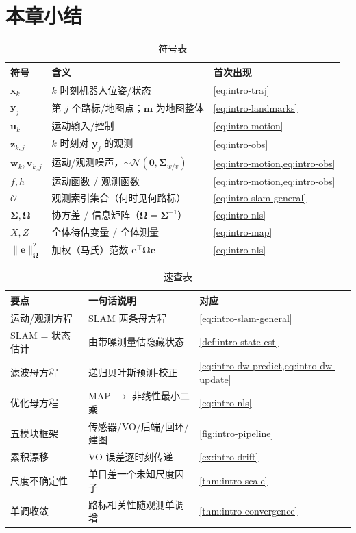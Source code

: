 \section*{本章小结}

\begin{table}[H]\centering\small
\caption{符号表}
\begin{tabular}{lll}
\toprule
符号 & 含义 & 首次出现 \\
\midrule
$\mathbf{x}_k$ & $k$ 时刻机器人位姿/状态 & \cref{eq:intro-traj} \\
$\mathbf{y}_j$ & 第 $j$ 个路标/地图点；$\mathbf{m}$ 为地图整体 & \cref{eq:intro-landmarks} \\
$\mathbf{u}_k$ & 运动输入/控制 & \cref{eq:intro-motion} \\
$\mathbf{z}_{k,j}$ & $k$ 时刻对 $\mathbf{y}_j$ 的观测 & \cref{eq:intro-obs} \\
$\mathbf{w}_k,\mathbf{v}_{k,j}$ & 运动/观测噪声，$\sim\mathcal{N}(\mathbf{0},\boldsymbol{\Sigma}_{w/v})$ & \cref{eq:intro-motion,eq:intro-obs} \\
$f,h$ & 运动函数 / 观测函数 & \cref{eq:intro-motion,eq:intro-obs} \\
$\mathcal{O}$ & 观测索引集合（何时见何路标） & \cref{eq:intro-slam-general} \\
$\boldsymbol{\Sigma},\boldsymbol{\Omega}$ & 协方差 / 信息矩阵（$\boldsymbol{\Omega}=\boldsymbol{\Sigma}^{-1}$） & \cref{eq:intro-nls} \\
$X,Z$ & 全体待估变量 / 全体测量 & \cref{eq:intro-map} \\
$\|\mathbf{e}\|_{\boldsymbol{\Omega}}^2$ & 加权（马氏）范数 $\mathbf{e}^\top\boldsymbol{\Omega}\mathbf{e}$ & \cref{eq:intro-nls} \\
\bottomrule
\end{tabular}
\end{table}

\begin{table}[H]\centering\small
\caption{速查表}
\begin{tabular}{lll}
\toprule
要点 & 一句话说明 & 对应 \\
\midrule
运动/观测方程 & SLAM 两条母方程 & \cref{eq:intro-slam-general} \\
SLAM = 状态估计 & 由带噪测量估隐藏状态 & \cref{def:intro-state-est} \\
滤波母方程 & 递归贝叶斯预测-校正 & \cref{eq:intro-dw-predict,eq:intro-dw-update} \\
优化母方程 & MAP $\to$ 非线性最小二乘 & \cref{eq:intro-nls} \\
五模块框架 & 传感器/VO/后端/回环/建图 & \cref{fig:intro-pipeline} \\
累积漂移 & VO 误差逐时刻传递 & \cref{ex:intro-drift} \\
尺度不确定性 & 单目差一个未知尺度因子 & \cref{thm:intro-scale} \\
单调收敛 & 路标相关性随观测单调增 & \cref{thm:intro-convergence} \\
\bottomrule
\end{tabular}
\end{table}

